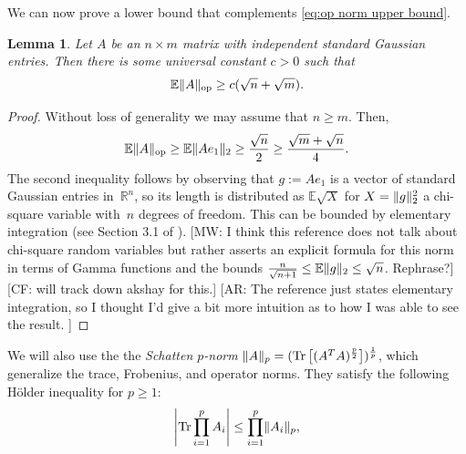 \documentclass[aos]{imsart}
\newtheorem{lemma}[theorem]{Lemma}
\theoremstyle{definition}
\numberwithin{equation}{section}
\DeclareMathOperator{\op}{op}
\DeclareMathOperator{\tr}{Tr}
\DeclarePairedDelimiter{\abs}{\lvert}{\rvert}
\DeclarePairedDelimiter{\norm}{\lVert}{\rVert}
\newcommand{\R}{{\mathbb{R}}}
\newcommand{\E}{\mathbb{E}}
\newcommand{\CF}[1]{{\color{purple}[CF: #1]}}
\newcommand{\AR}[1]{{\color{orange}[AR: #1]}}
\newcommand{\MW}[1]{{\color{red}[MW: #1]}}
\newcommand{\CF}[1]{{}}
\newcommand{\AR}[1]{{}}
\newcommand{\MW}[1]{{}}
\begin{document}
\begin{appendix}
We can now prove a lower bound that complements \cref{eq:op norm upper bound}.

\begin{lemma}\label{lem:op norm lower bound}
Let $A$ be an $n \times m$ matrix with independent standard Gaussian entries. Then there is some universal constant $c > 0$ such that
\begin{equation*}
  \E \norm{A}_{\op} \geq c (\sqrt{n} + \sqrt{m}).
\end{equation*}
\end{lemma}
\begin{proof}
Without loss of generality we may assume that $n \geq m$.
Then,
\[ \E \norm{A}_{\op} \geq \E \norm{A e_{1}}_{2} \geq \frac{\sqrt{n}}{2} \geq \frac{\sqrt{m} + \sqrt{n}}{4}. \]
The second inequality follows by observing that $g := A e_1$ is a vector of standard Gaussian entries in~$\R^n$, so its length is distributed as $\E\sqrt X$ for $X = \norm g_2^2$ a chi-square variable with~$n$ degrees of freedom. This can be bounded by elementary integration (see Section 3.1 of \cite{ENormLB}).
\MW{I think this reference does not talk about chi-square random variables but rather asserts an explicit formula for this norm in terms of Gamma functions and the bounds $\frac n {\sqrt{n+1}} \leq \E\norm g_2 \leq \sqrt n$. Rephrase?}\CF{will track down akshay for this.} \AR{The reference just states elementary integration, so I thought I'd give a bit more intuition as to how I was able to see the result. }
\end{proof}

We will also use the the \emph{Schatten $p$-norm} $\norm{A}_p = (\tr\left[(A^TA)^{\frac p2}\right])^{\frac1p}$, which generalize the trace, Frobenius, and operator norms.
They satisfy the following H\"older inequality for $p\geq1$:
\begin{align}\label{eq:holder}
  \abs*{\tr \prod_{i=1}^{p} A_i} \leq \prod_{i=1}^{p} \norm{A_i}_p,
\end{align}


\end{appendix}
\end{document}
